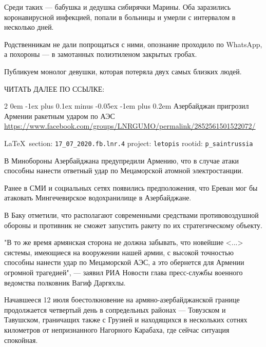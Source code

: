 \documentclass[a4paper,11pt]{extreport}
\makeatletter
\renewcommand\subsection{%
  \clearpage
    \@startsection{subsection}%
    {2}%
    {0em}%
    {-1ex plus 0.1ex minus -0.05ex}%
    {-1em plus 0.2em}%
    {\scshape\bfseries\Large}%
}
\makeatother
\begin{document}
Среди таких --- бабушка и дедушка сибирячки Марины.  Оба заразились
коронавирусной инфекцией, попали в больницы и умерли с интервалом в несколько
дней.

Родственникам не дали попрощаться с ними, опознание проходило по WhatsApp, а
похороны --- в замотанных полиэтиленом закрытых гробах.

Публикуем монолог девушки, которая потеряла двух самых близких людей.

ЧИТАТЬ ДАЛЕЕ ПО ССЫЛКЕ: 
 
 
\subsection{Азербайджан пригрозил Армении ракетным ударом по АЭС}
\label{sec:17_07_2020.fb.lnr.4}
\url{https://www.facebook.com/groups/LNRGUMO/permalink/2852561501522072/}
  
\vspace{0.5cm}
{\ifDEBUG\small\LaTeX~section: \verb|17_07_2020.fb.lnr.4| project: \verb|letopis| rootid: \verb|p_saintrussia|\fi}
\vspace{0.5cm}

В Минобороны Азербайджана предупредили Армению, что в случае атаки способны
нанести ответный удар по Мецаморской атомной электростанции.

Ранее в СМИ и социальных сетях появились предположения, что Ереван мог бы
атаковать Мингечевирское водохранилище в Азербайджане.

В Баку отметили, что располагают современными средствами противовоздушной
обороны и противник не сможет запустить ракету по их стратегическому объекту.

"В то же время армянская сторона не должна забывать, что новейшие <...>
системы, имеющиеся на вооружении нашей армии, с высокой точностью способны
нанести удар по Мецаморской АЭС, а это обернется для Армении огромной
трагедией", --- заявил РИА Новости глава пресс-службы военного ведомства
полковник Вагиф Даргяхлы.

Начавшееся 12 июля боестолкновение на армяно-азербайджанской границе
продолжается четвертый день в сопредельных районах --- Товузском и Тавушском,
граничащих также с Грузией и находящихся в нескольких сотнях километров от
непризнанного Нагорного Карабаха, где сейчас ситуация спокойная.
\end{document}
